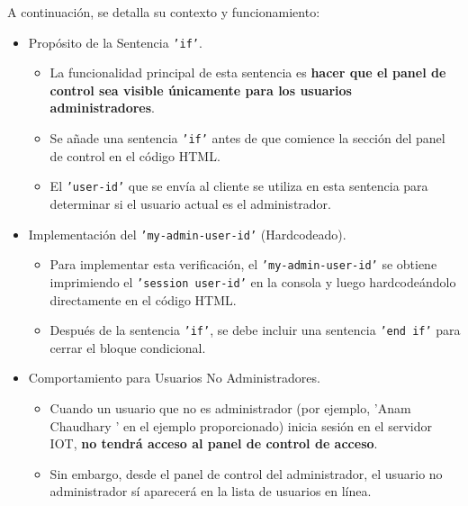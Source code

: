 \documentclass{report}
\begin{document}
A continuación, se detalla su contexto y funcionamiento:
\begin{itemize}
    \item Propósito de la Sentencia \texttt{'if'}.
    \begin{itemize}
        \item La funcionalidad principal de esta sentencia es \textbf{hacer que el panel de control sea visible únicamente para los usuarios administradores}.
        \item Se añade una sentencia \texttt{'if'} antes de que comience la sección del panel de control en el código HTML.
        \item El \texttt{'user-id'} que se envía al cliente se utiliza en esta sentencia para determinar si el usuario actual es el administrador.
    \end{itemize}

    \item Implementación del \texttt{'my-admin-user-id'} (Hardcodeado).
    \begin{itemize}
        \item Para implementar esta verificación, el \texttt{'my-admin-user-id'} se obtiene imprimiendo el \texttt{'session user-id'} en la consola y luego
              hardcodeándolo directamente en el código HTML.
        \item Después de la sentencia \texttt{'if'}, se debe incluir una sentencia \texttt{'end if'} para cerrar el bloque condicional.
    \end{itemize}

    \item Comportamiento para Usuarios No Administradores.
    \begin{itemize}
        \item Cuando un usuario que no es administrador (por ejemplo,  'Anam Chaudhary ' en el ejemplo proporcionado) inicia sesión en el servidor IOT, 
              \textbf{no tendrá acceso al panel de control de acceso}.
        \item Sin embargo, desde el panel de control del administrador, el usuario no administrador sí aparecerá en la lista de usuarios en línea.
    \end{itemize}


\end{itemize}
\end{document}
